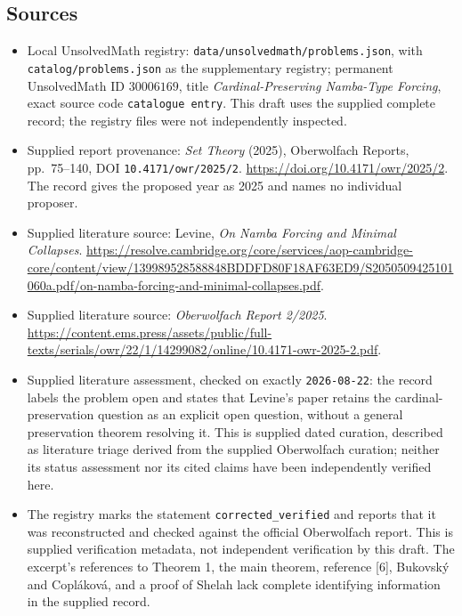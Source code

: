 \documentclass[11pt]{article}
\begin{document}
\subsection{Sources}
\begin{itemize}
\item Local UnsolvedMath registry: \texttt{data/unsolvedmath/problems.json}, with \texttt{catalog/problems.json} as the supplementary registry; permanent UnsolvedMath ID \(30006169\), title \emph{Cardinal-Preserving Namba-Type Forcing}, exact source code \texttt{catalogue entry}. This draft uses the supplied complete record; the registry files were not independently inspected.
\item Supplied report provenance: \emph{Set Theory} (2025), Oberwolfach Reports, pp.~75--140, DOI \texttt{10.4171/owr/2025/2}. \url{https://doi.org/10.4171/owr/2025/2}. The record gives the proposed year as 2025 and names no individual proposer.
\item Supplied literature source: Levine, \emph{On Namba Forcing and Minimal Collapses}. \url{https://resolve.cambridge.org/core/services/aop-cambridge-core/content/view/139989528588848BDDFD80F18AF63ED9/S2050509425101060a.pdf/on-namba-forcing-and-minimal-collapses.pdf}.
\item Supplied literature source: \emph{Oberwolfach Report 2/2025}. \url{https://content.ems.press/assets/public/full-texts/serials/owr/22/1/14299082/online/10.4171-owr-2025-2.pdf}.
\item Supplied literature assessment, checked on exactly \texttt{2026-08-22}: the record labels the problem open and states that Levine's paper retains the cardinal-preservation question as an explicit open question, without a general preservation theorem resolving it. This is supplied dated curation, described as literature triage derived from the supplied Oberwolfach curation; neither its status assessment nor its cited claims have been independently verified here.
\item The registry marks the statement \texttt{corrected\_verified} and reports that it was reconstructed and checked against the official Oberwolfach report. This is supplied verification metadata, not independent verification by this draft. The excerpt's references to Theorem 1, the main theorem, reference [6], Bukovsk\'y and Copl\'akov\'a, and a proof of Shelah lack complete identifying information in the supplied record.
\end{itemize}
\end{document}
